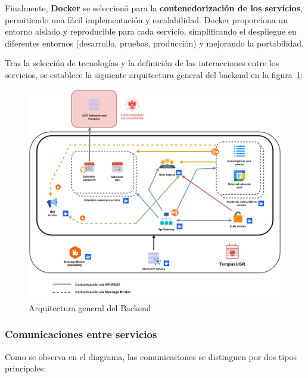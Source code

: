Finalmente, \textbf{Docker} se seleccionó para la \textbf{contenedorización de los servicios}, permitiendo una fácil implementación y escalabilidad. Docker proporciona un entorno aislado y reproducible para cada servicio, simplificando el despliegue en diferentes entornos (desarrollo, pruebas, producción) y mejorando la portabilidad.

Tras la selección de tecnologías y la definición de las interacciones entre los servicios, se establece la siguiente arquitectura general del backend en la figura~\ref{fig:backend_architecture}:

\begin{figure}[H]
    \centering
    \includegraphics[width=1\textwidth]{figures/06_arq.png}
    \caption{Arquitectura general del Backend}
    \label{fig:backend_architecture}
\end{figure}

\subsubsection{Comunicaciones entre servicios}

Como se observa en el diagrama, las comunicaciones se distinguen por dos tipos principales:

